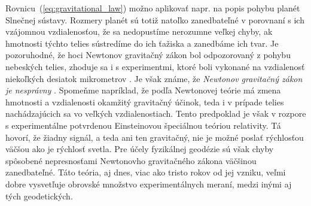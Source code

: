 \documentclass[a4paper, 12pt]{book}
\begin{document}
Rovnicu~(\ref{eq:gravitational_law}) možno aplikovať napr. na popis pohybu 
planét Slnečnej sústavy.  Rozmery planét sú totiž natoľko zanedbateľné 
v porovnaní s ich vzájomnou vzdialenosťou, že sa nedopustíme nerozumne veľkej 
chyby, ak hmotnosti týchto telies sústredíme do ich ťažiska a zanedbáme ich 
tvar.  Je pozoruhodné, že hoci Newtonov gravitačný zákon bol odpozorovaný 
z pohybu nebeských telies, zhoduje sa i s experimentmi, ktoré boli vykonané na 
vzdialenosť niekoľkých desiatok mikrometrov \citep{Lee2020}.  Je však známe, že 
\emph{Newtonov gravitačný zákon je nesprávny} \citep{Feynman}.  Spomeňme 
napríklad, že podľa Newtonovej teórie má zmena hmotnosti a vzdialenosti 
okamžitý gravitačný účinok, teda i v prípade telies nachádzajúcich sa vo 
veľkých vzdialenostiach.  Tento predpoklad je však v rozpore s experimentálne 
potvrdenou Einsteinovou špeciálnou teóriou relativity.  Tá hovorí, že žiadny 
signál, a teda ani ten gravitačný, nie je možné poslať rýchlosťou väčšou ako je 
rýchlosť svetla.  Pre účely fyzikálnej geodézie sú však chyby spôsobené 
nepresnosťami Newtonovho gravitačného zákona väčšinou zanedbateľné.  Táto 
teória, aj dnes, viac ako tristo rokov od jej vzniku, veľmi dobre vysvetľuje 
obrovské množstvo experimentálnych meraní, medzi inými aj tých geodetických.  
\end{document}
